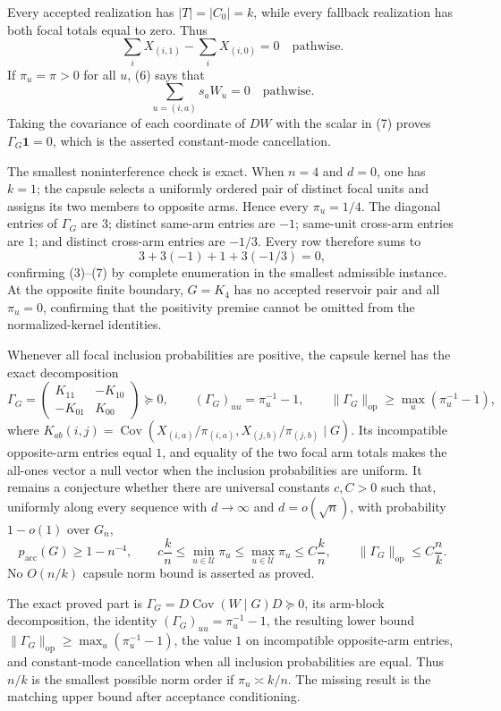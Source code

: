 Every accepted realization has \(|T|=|C_0|=k\), while every fallback realization has both focal totals equal to zero.  Thus
\[
\sum_iX_{(i,1)}-\sum_iX_{(i,0)}=0 \quad\text{pathwise}. \tag{6}
\]
If \(\pi_u=\pi>0\) for all \(u\), (6) says that
\[
\sum_{u=(i,a)}s_aW_u=0 \quad\text{pathwise}. \tag{7}
\]
Taking the covariance of each coordinate of \(DW\) with the scalar in (7) proves \(\Gamma_G\mathbf 1=0\), which is the asserted constant-mode cancellation.

The smallest noninterference check is exact.  When \(n=4\) and \(d=0\), one has \(k=1\); the capsule selects a uniformly ordered pair of distinct focal units and assigns its two members to opposite arms.  Hence every \(\pi_u=1/4\).  The diagonal entries of \(\Gamma_G\) are \(3\); distinct same-arm entries are \(-1\); same-unit cross-arm entries are \(1\); and distinct cross-arm entries are \(-1/3\).  Every row therefore sums to
\[
3+3(-1)+1+3(-1/3)=0,
\]
confirming (3)--(7) by complete enumeration in the smallest admissible instance.  At the opposite finite boundary, \(G=K_4\) has no accepted reservoir pair and all \(\pi_u=0\), confirming that the positivity premise cannot be omitted from the normalized-kernel identities.

Whenever all focal inclusion probabilities are positive, the capsule kernel has the exact decomposition
\[
\Gamma_G=
\begin{pmatrix}K_{11}&-K_{10}\\-K_{01}&K_{00}\end{pmatrix}\succeq0,
\qquad
(\Gamma_G)_{uu}=\pi_u^{-1}-1,
\qquad
\|\Gamma_G\|_{\mathrm{op}}\ge\max_u(\pi_u^{-1}-1),
\]
where \(K_{ab}(i,j)=\operatorname{Cov}(X_{(i,a)}/\pi_{(i,a)},X_{(j,b)}/\pi_{(j,b)}\mid G)\).  Its incompatible opposite-arm entries equal \(1\), and equality of the two focal arm totals makes the all-ones vector a null vector when the inclusion probabilities are uniform.  It remains a conjecture whether there are universal constants \(c,C>0\) such that, uniformly along every sequence with \(d\to\infty\) and \(d=o(\sqrt n)\), with probability \(1-o(1)\) over \(G_n\),
\[
p_{\mathrm{acc}}(G)\ge1-n^{-4},
\qquad
c\frac{k}{n}\le\min_{u\in\mathcal U}\pi_u
\le\max_{u\in\mathcal U}\pi_u\le C\frac{k}{n},
\qquad
\|\Gamma_G\|_{\mathrm{op}}\le C\frac{n}{k}.
\]
No \(O(n/k)\) capsule norm bound is asserted as proved.

The exact proved part is \(\Gamma_G=D\operatorname{Cov}(W\mid G)D\succeq0\), its arm-block decomposition, the identity \((\Gamma_G)_{uu}=\pi_u^{-1}-1\), the resulting lower bound \(\|\Gamma_G\|_{\mathrm{op}}\ge\max_u(\pi_u^{-1}-1)\), the value \(1\) on incompatible opposite-arm entries, and constant-mode cancellation when all inclusion probabilities are equal.  Thus \(n/k\) is the smallest possible norm order if \(\pi_u\asymp k/n\).  The missing result is the matching upper bound after acceptance conditioning.

